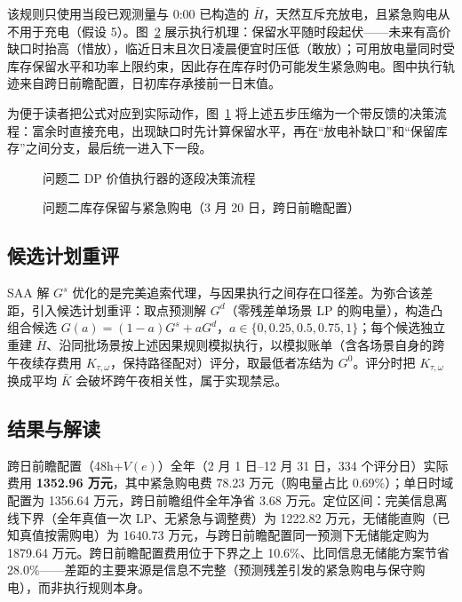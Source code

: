 该规则只使用当段已观测量与 0:00 已构造的 $\bar H$，天然互斥充放电，且紧急购电从不用于充电（假设 5）。图~\ref{fig:fig_f06_dp_mechanism} 展示执行机理：保留水平随时段起伏——未来有高价缺口时抬高（惜放），临近日末且次日凌晨便宜时压低（敢放）；可用放电量同时受库存保留水平和功率上限约束，因此存在库存时仍可能发生紧急购电。图中执行轨迹来自跨日前瞻配置，日初库存承接前一日末值。

为便于读者把公式对应到实际动作，图~\ref{fig:fig_f19_dp_flowchart} 将上述五步压缩为一个带反馈的决策流程：富余时直接充电，出现缺口时先计算保留水平，再在“放电补缺口”和“保留库存”之间分支，最后统一进入下一段。

\begin{figure}[!htbp]\centering
{}
\caption{问题二 DP 价值执行器的逐段决策流程}\label{fig:fig_f19_dp_flowchart}
\end{figure}

\begin{figure}[!htbp]\centering
{}
\caption{问题二库存保留与紧急购电（3 月 20 日，跨日前瞻配置）}\label{fig:fig_f06_dp_mechanism}
\end{figure}

\subsection{候选计划重评}
SAA 解 $G^s$ 优化的是完美追索代理，与因果执行之间存在口径差。为弥合该差距，引入候选计划重评：取点预测解 $G^d$（零残差单场景 LP 的购电量），构造凸组合候选 $G(a)=(1-a)G^s+aG^d$，$a\in\{0,0.25,0.5,0.75,1\}$；每个候选独立重建 $\bar H$、沿同批场景按上述因果规则模拟执行，以模拟账单（含各场景自身的跨午夜续存费用 $K_{\tau,\omega}$，保持路径配对）评分，取最低者冻结为 $G^0$。评分时把 $K_{\tau,\omega}$ 换成平均 $\bar K$ 会破坏跨午夜相关性，属于实现禁忌。

\subsection{结果与解读}
跨日前瞻配置（48h+$V(e)$）全年（2 月 1 日--12 月 31 日，334 个评分日）实际费用 \textbf{1352.96 万元}，其中紧急购电费 78.23 万元（购电量占比 0.69\%）；单日时域配置为 1356.64 万元，跨日前瞻组件全年净省 3.68 万元。定位区间：完美信息离线下界（全年真值一次 LP、无紧急与调整费）为 1222.82 万元，无储能直购（已知真值按需购电）为 1640.73 万元，与跨日前瞻配置同一预测下无储能定购为 1879.64 万元。跨日前瞻配置费用位于下界之上 10.6\%、比同信息无储能方案节省 28.0\%——差距的主要来源是信息不完整（预测残差引发的紧急购电与保守购电），而非执行规则本身。





